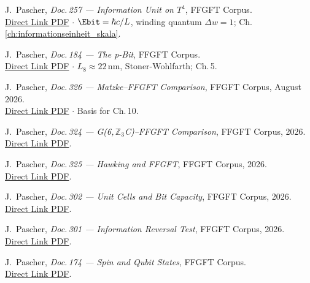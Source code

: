 \begin{description}[leftmargin=3.5em,style=sameline,itemsep=0.4em]
\item[{[P7]}] J.~Pascher, \textit{Doc.\,257 — Information Unit on $T^4$},
  FFGFT Corpus.\\
  \href{https://github.com/jpascher/T0-Time-Mass-Duality/blob/main/2/pdf/257_Informationseinheit_Skala_De.pdf}{Direct Link PDF}
  $\cdot$ $\Ebit = \hbar c/L$, winding quantum $\Delta w = 1$; Ch.\,\ref{ch:informationseinheit_skala}.

\item[{[P8]}] J.~Pascher, \textit{Doc.\,184 — The p-Bit},
  FFGFT Corpus.\\
  \href{https://github.com/jpascher/T0-Time-Mass-Duality/blob/main/2/pdf/184_p-bit_De.pdf}{Direct Link PDF}
  $\cdot$ $L_8 \approx 22\,\text{nm}$, Stoner-Wohlfarth; Ch.\,5.

\item[{[P9]}] J.~Pascher, \textit{Doc.\,326 — Matzke--FFGFT Comparison},
  FFGFT Corpus, August 2026.\\
  \href{https://github.com/jpascher/T0-Time-Mass-Duality/blob/main/2/pdf/326_Matzke_FFGFT_Vergleich_De.pdf}{Direct Link PDF}
  $\cdot$ Basis for Ch.\,10.

\item[{[P10]}] J.~Pascher, \textit{Doc.\,324 — G(6,\,$\mathbb{Z}_3$C)--FFGFT Comparison},
  FFGFT Corpus, 2026.\\
  \href{https://github.com/jpascher/T0-Time-Mass-Duality/blob/main/2/pdf/324_G6_Z3C_FFGFT_Vergleich_De.pdf}{Direct Link PDF}.

\item[{[P11]}] J.~Pascher, \textit{Doc.\,325 — Hawking and FFGFT},
  FFGFT Corpus, 2026.\\
  \href{https://github.com/jpascher/T0-Time-Mass-Duality/blob/main/2/pdf/325_Hawking_FFGFT_De.pdf}{Direct Link PDF}.

\item[{[P12]}] J.~Pascher, \textit{Doc.\,302 — Unit Cells and Bit Capacity},
  FFGFT Corpus, 2026.\\
  \href{https://github.com/jpascher/T0-Time-Mass-Duality/blob/main/2/pdf/302_Elementarzellen_Spektrale_Antwort_De.pdf}{Direct Link PDF}.

\item[{[P13]}] J.~Pascher, \textit{Doc.\,301 — Information Reversal Test},
  FFGFT Corpus, 2026.\\
  \href{https://github.com/jpascher/T0-Time-Mass-Duality/blob/main/2/pdf/301_Information_Umkehrtest_De.pdf}{Direct Link PDF}.

\item[{[P14]}] J.~Pascher, \textit{Doc.\,174 — Spin and Qubit States},
  FFGFT Corpus.\\
  \href{https://github.com/jpascher/T0-Time-Mass-Duality/blob/main/2/pdf/174_T0_Spin_Qubit_Zustaende_De.pdf}{Direct Link PDF}.

\end{description}

